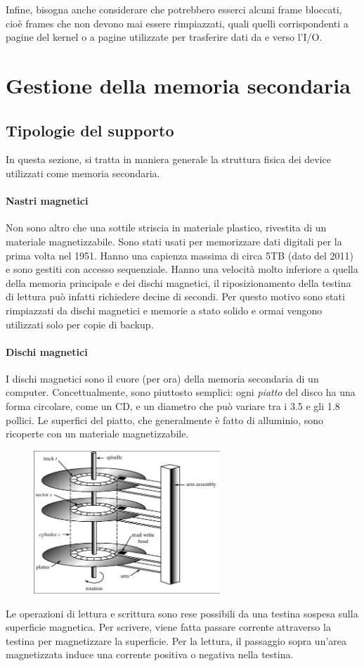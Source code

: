 \documentclass[a4paper]{article}
\begin{document}
Infine, bisogna anche considerare che potrebbero esserci alcuni frame bloccati, cioè frames che non devono mai essere rimpiazzati, quali quelli corrispondenti a pagine del kernel o a pagine utilizzate per trasferire dati da e verso l'I/O.


\section{Gestione della memoria secondaria}

\subsection{Tipologie del supporto}
In questa sezione, si tratta in maniera generale la struttura fisica dei device utilizzati come memoria secondaria.

\paragraph{Nastri magnetici}
Non sono altro che una sottile striscia in materiale plastico, rivestita di un materiale magnetizzabile. Sono stati usati per memorizzare dati digitali per la prima volta nel 1951. Hanno una capienza massima di circa 5TB (dato del 2011) e sono gestiti con accesso sequenziale. Hanno una velocità molto inferiore a quella della memoria principale e dei dischi magnetici, il riposizionamento della testina di lettura può infatti richiedere decine di secondi. Per questo motivo sono stati rimpiazzati da dischi magnetici e memorie a stato solido e ormai vengono utilizzati solo per copie di backup.

\paragraph{Dischi magnetici}
I dischi magnetici sono il cuore (per ora) della memoria secondaria di un computer. Concettualmente, sono piuttosto semplici: ogni \textit{piatto} del disco ha una forma circolare, come un CD, e un diametro che può variare tra i 3.5 e gli 1.8 pollici. Le superfici del piatto, che generalmente è fatto di alluminio, sono ricoperte con un materiale magnetizzabile.

\begin{figure}
    \includegraphics[width=7cm]{img/disk.JPG}
\end{figure}
Le operazioni di lettura e scrittura sono rese possibili da una testina sospesa sulla superficie magnetica. Per scrivere, viene fatta passare corrente attraverso la testina per magnetizzare la superficie. Per la lettura, il passaggio sopra un'area magnetizzata induce una corrente positiva o negativa nella testina.
\end{document}
